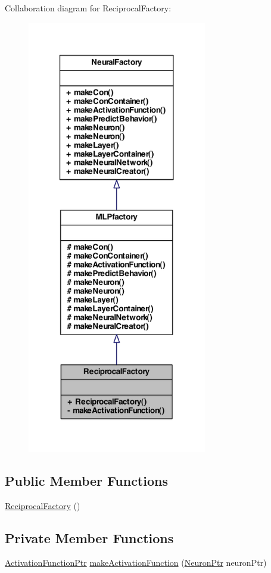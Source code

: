 Collaboration diagram for ReciprocalFactory:
\nopagebreak
\begin{figure}[H]
\begin{center}
\leavevmode
\includegraphics[width=222pt]{class_reciprocal_factory__coll__graph}
\end{center}
\end{figure}
\subsection*{Public Member Functions}
\begin{DoxyCompactItemize}
\item 
\hyperlink{class_reciprocal_factory_a28e434cb3f1f3a007f7d91c8a6f21ea9}{ReciprocalFactory} ()
\end{DoxyCompactItemize}
\subsection*{Private Member Functions}
\begin{DoxyCompactItemize}
\item 
\hyperlink{_a_m_o_r_e_8h_a77602a0277a02e5769c3df0adc669b17}{ActivationFunctionPtr} \hyperlink{class_reciprocal_factory_a4258da65a19ff656c79bac5f2699b8d8}{makeActivationFunction} (\hyperlink{_a_m_o_r_e_8h_ac1ea936c2c7728eb382278131652fef4}{NeuronPtr} neuronPtr)
\end{DoxyCompactItemize}


